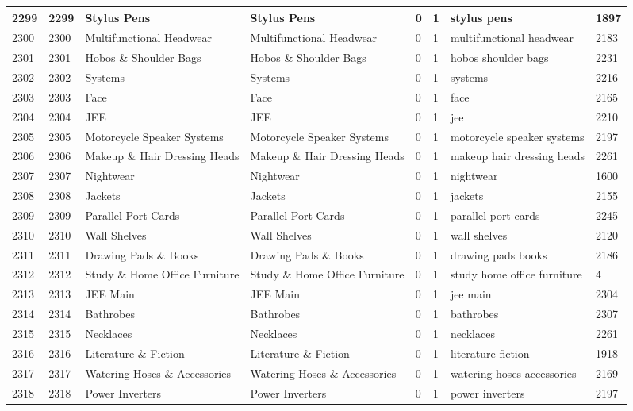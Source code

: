 \begin{longtable}{|l|l|l|l|l|l|l|l|}
2299 & 2299 & Stylus Pens & Stylus Pens & 0 & 1 & stylus pens & 1897 \\ \hline 
2300 & 2300 & Multifunctional Headwear & Multifunctional Headwear & 0 & 1 & multifunctional headwear & 2183 \\ \hline 
2301 & 2301 & Hobos \& Shoulder Bags & Hobos \& Shoulder Bags & 0 & 1 & hobos shoulder bags & 2231 \\ \hline 
2302 & 2302 & Systems & Systems & 0 & 1 & systems & 2216 \\ \hline 
2303 & 2303 & Face & Face & 0 & 1 & face & 2165 \\ \hline 
2304 & 2304 & JEE & JEE & 0 & 1 & jee & 2210 \\ \hline 
2305 & 2305 & Motorcycle Speaker Systems & Motorcycle Speaker Systems & 0 & 1 & motorcycle speaker systems & 2197 \\ \hline 
2306 & 2306 & Makeup \& Hair Dressing Heads & Makeup \& Hair Dressing Heads & 0 & 1 & makeup hair dressing heads & 2261 \\ \hline 
2307 & 2307 & Nightwear & Nightwear & 0 & 1 & nightwear & 1600 \\ \hline 
2308 & 2308 & Jackets & Jackets & 0 & 1 & jackets & 2155 \\ \hline 
2309 & 2309 & Parallel Port Cards & Parallel Port Cards & 0 & 1 & parallel port cards & 2245 \\ \hline 
2310 & 2310 & Wall Shelves & Wall Shelves & 0 & 1 & wall shelves & 2120 \\ \hline 
2311 & 2311 & Drawing Pads \& Books & Drawing Pads \& Books & 0 & 1 & drawing pads books & 2186 \\ \hline 
2312 & 2312 & Study \& Home Office Furniture & Study \& Home Office Furniture & 0 & 1 & study home office furniture & 4 \\ \hline 
2313 & 2313 & JEE Main & JEE Main & 0 & 1 & jee main & 2304 \\ \hline 
2314 & 2314 & Bathrobes & Bathrobes & 0 & 1 & bathrobes & 2307 \\ \hline 
2315 & 2315 & Necklaces & Necklaces & 0 & 1 & necklaces & 2261 \\ \hline 
2316 & 2316 & Literature \& Fiction & Literature \& Fiction & 0 & 1 & literature fiction & 1918 \\ \hline 
2317 & 2317 & Watering Hoses \& Accessories & Watering Hoses \& Accessories & 0 & 1 & watering hoses accessories & 2169 \\ \hline 
2318 & 2318 & Power Inverters & Power Inverters & 0 & 1 & power inverters & 2197 \\ \hline 

\end{longtable}
